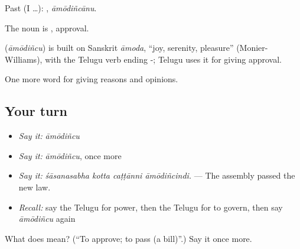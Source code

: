 Past (I …): , \emph{āmōdiñcānu}.

The noun is , approval.

\begin{cousinweb}
\textbf{} (\emph{āmōdiñcu}) is built on Sanskrit \emph{āmoda}, \textquotedblleft{}joy, serenity, pleasure\textquotedblright{} (Monier-Williams), with the Telugu verb ending -; Telugu uses it for giving approval.
\end{cousinweb}

\begin{grammarlens}[title={What you've built}]
One more word for giving reasons and opinions.
\end{grammarlens}

\subsection*{Your turn}
\begin{itemize}
\raggedright
  \item \emph{Say it:} \emph{āmōdiñcu}
  \item \emph{Say it:} \emph{āmōdiñcu}, once more
  \item \emph{Say it:} \emph{śāsanasabha kotta caṭṭānni āmōdiñcindi.} — The assembly passed the new law.
  \item \emph{Recall:} say the Telugu for power, then the Telugu for to govern, then say \emph{āmōdiñcu} again
\end{itemize}

\begin{tcolorbox}[breakable,colback=teal!4,colframe=teal!35!black,title={Before you move on}]
What does  mean? (\textquotedblleft{}To approve; to pass (a bill)\textquotedblright{}.) Say it once more.
\end{tcolorbox}
